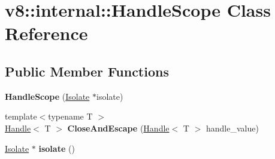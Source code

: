 \hypertarget{classv8_1_1internal_1_1_handle_scope}{}\section{v8\+:\+:internal\+:\+:Handle\+Scope Class Reference}
\label{classv8_1_1internal_1_1_handle_scope}
\subsection*{Public Member Functions}
\begin{DoxyCompactItemize}
\item 
{\bfseries Handle\+Scope} (\hyperlink{classv8_1_1internal_1_1_isolate}{Isolate} $\ast$isolate)\hypertarget{classv8_1_1internal_1_1_handle_scope_a3742f18d5b401cc58fcf6168ebca077d}{}\label{classv8_1_1internal_1_1_handle_scope_a3742f18d5b401cc58fcf6168ebca077d}

\item 
{\footnotesize template$<$typename T $>$ }\\\hyperlink{classv8_1_1internal_1_1_handle}{Handle}$<$ T $>$ {\bfseries Close\+And\+Escape} (\hyperlink{classv8_1_1internal_1_1_handle}{Handle}$<$ T $>$ handle\+\_\+value)\hypertarget{classv8_1_1internal_1_1_handle_scope_a37fa551b0621f759ebc0aed8d8061384}{}\label{classv8_1_1internal_1_1_handle_scope_a37fa551b0621f759ebc0aed8d8061384}

\item 
\hyperlink{classv8_1_1internal_1_1_isolate}{Isolate} $\ast$ {\bfseries isolate} ()\hypertarget{classv8_1_1internal_1_1_handle_scope_afebe38c26e4dad47b86d195898bd6400}{}\label{classv8_1_1internal_1_1_handle_scope_afebe38c26e4dad47b86d195898bd6400}

\end{DoxyCompactItemize}
